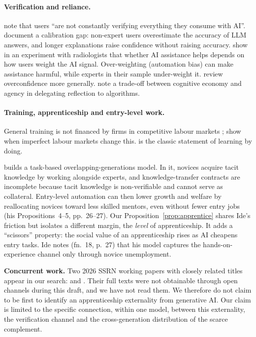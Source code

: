 \documentclass[12pt]{article}
\theoremstyle{remark}
\begin{document}
\paragraph{Verification and reliance.} \citet[p.~383]{stiglitz2026information} note that users ``are not constantly verifying everything they consume with AI''. \citet{steyvers2025know} document a calibration gap: non-expert users overestimate the accuracy of LLM answers, and longer explanations raise confidence without raising accuracy. \citet{agarwal2023radiology} show in an experiment with radiologists that whether AI assistance helps depends on how users weight the AI signal. Over-weighting (automation bias) can make assistance harmful, while experts in their sample under-weight it. \citet{moore2008overconfidence} review overconfidence more generally. \citet[p.~277, fn.~6]{ludwig2026reflective} note a trade-off between cognitive economy and agency in delegating reflection to algorithms.

\paragraph{Training, apprenticeship and entry-level work.} General training is not financed by firms in competitive labour markets \citep{becker1962investment}; \citet{acemoglu1998train,acemoglu1999becker} show when imperfect labour markets change this. \citet{arrow1962learning} is the classic statement of learning by doing.

\citet{ide2025automation} builds a task-based overlapping-generations model. In it, novices acquire tacit knowledge by working alongside experts, and knowledge-transfer contracts are incomplete because tacit knowledge is non-verifiable and cannot serve as collateral. Entry-level automation can then lower growth and welfare by reallocating novices toward less skilled mentors, even without fewer entry jobs (his Propositions~4--5, pp.~26--27). Our Proposition~\ref{prop:apprentice} shares Ide's friction but isolates a different margin, the \emph{level} of apprenticeship. It adds a ``scissors'' property: the social value of an apprenticeship rises as AI cheapens entry tasks. Ide notes (fn.~18, p.~27) that his model captures the hands-on-experience channel only through novice unemployment.

\textbf{Concurrent work.} Two 2026 SSRN working papers with closely related titles appear in our search: \citet{akin2026apprenticeship} and \citet{singh2026apprenticeship}. Their full texts were not obtainable through open channels during this draft, and we have not read them. We therefore do not claim to be first to identify an apprenticeship externality from generative AI. Our claim is limited to the specific connection, within one model, between this externality, the verification channel and the cross-generation distribution of the scarce complement.
\end{document}
